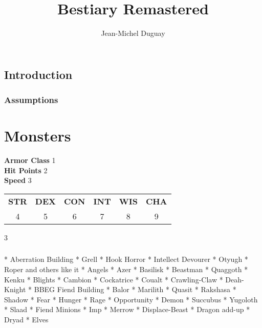 \documentclass[letterpaper,10pt,twoside,twocolumn,openany]{book}
\author{Jean-Michel Duguay}
\title{Bestiary Remastered}
\begin{document}
\tableofcontents

\chapter{Introduction}

\section{Assumptions}

\part{Monsters}

\newcommand{\MonsterUpper}[9]{
\textbf{Armor Class} #1\\
\textbf{Hit Points} #2\\
\textbf{Speed} #3
\tcbline
\begin{center}

\begin{tabular}{c c c c c c}
\textbf{STR} & \textbf{DEX} & \textbf{CON} & \textbf{INT} & \textbf{WIS} & \textbf{CHA} \\
#4 & #5 & #6 & #7 & #8 & #9

\end{tabular}
\tcbline
\end{center}
}


\newcommand{\Statblock}[5]{\begin{tcolorbox}[title={{\LARGE\textbf{#1}}\\ %
\small\textit{#2}}, %
colframe=\Color , 
colback=\LighterColor, 
float,
arc=0mm,
segmentation style={solid, \Color},
boxrule = 0mm,
]
\MonsterUpper{1}{2}{3}{4}{5}{6}{7}{8}{9} 
#3 %
\tcbline 
#4 %
\tcbline
#5
\end{tcolorbox}}


\Statblock{1}{2}{3}{4}{5}

\section{}

* Aberration Building
	* Grell
	* Hook Horror
	* Intellect Devourer
	* Otyugh
	* Roper and others like it
* Angels %
* Azer %
* Basilisk %
* Beastman %
	* Quaggoth
	* Kenku
* Blights %
* Cambion %
* Cockatrice %
* Coualt %
* Crawling-Claw %
* Deah-Knight %
* BBEG Fiend Building %
	* Balor %
	* Marilith %
	* Quasit %
	* Rakshasa %
	* Shadow  
	* Fear 
	* Hunger
	* Rage
	* Opportunity
	* Demon
	* Succubus
	* Yugoloth
	* Slaad
* Fiend Minions %
	* Imp %
	* Merrow
* Displace-Beast %
* Dragon add-up
* Dryad %
* Elves %
\end{document}
